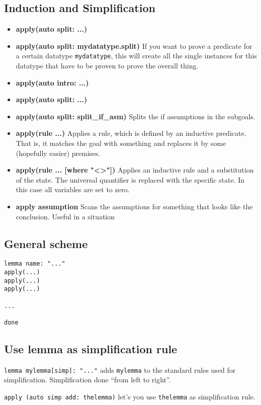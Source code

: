 \documentclass{article}
\begin{document}
\subsection{Induction and Simplification}
\begin{itemize}
	\item \textbf{apply(auto split: ...)}
	\item \textbf{apply(auto split: mydatatype.split)} If you want to prove a predicate for a certain datatype \texttt{mydatatype}, this will create all the single instances for this datatype that have to be proven to prove the overall thing.
	\item \textbf{apply(auto intro: ...)}
	\item \textbf{apply(auto split: ...)}
	\item \textbf{apply(auto split: split\_if\_asm)} Splits the if assumptions in the subgoals.
	\item \textbf{apply(rule ...)} Applies a rule, which is defined by an inductive predicate. That is, it matches the goal with something and replaces it by some (hopefully easier) premises.
	\item \textbf{apply(rule ... [where "\textless\textgreater"])} Applies an inductive rule and a substitution of the state. The universal quantifier is replaced with the specific state. In this case all variables are set to zero.
	\item \textbf{apply assumption} Scans the assumptions for something that looks like the conclusion. Useful in a situation
\end{itemize}

\subsection{General scheme}
\begin{verbatim}
lemma name: "..."
apply(...)
apply(...)
apply(...)

...

done
\end{verbatim}

\subsection{Use lemma as simplification rule}

\texttt{lemma mylemma[simp]: "..."} adds \texttt{mylemma} to the standard rules used for simplification. Simplification done ``from left to right''.

\texttt{apply (auto simp add: thelemma)} let's you use \texttt{thelemma} as simplification rule.
\end{document}
